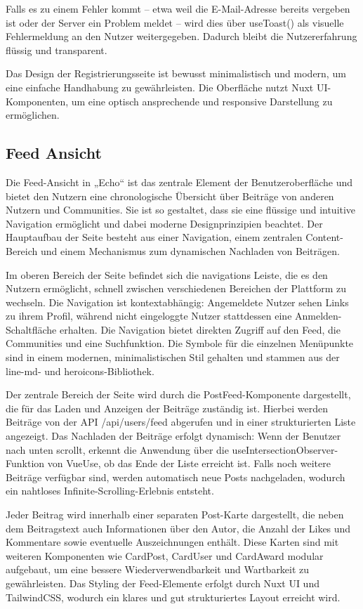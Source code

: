 \documentclass[a4paper,12pt]{article}
\begin{document}
Falls es zu einem Fehler kommt – etwa weil die E-Mail-Adresse bereits vergeben
ist oder der Server ein Problem meldet – wird dies über useToast() als visuelle
Fehlermeldung an den Nutzer weitergegeben. Dadurch bleibt die Nutzererfahrung
flüssig und transparent.

Das Design der Registrierungsseite ist bewusst minimalistisch und modern, um
eine einfache Handhabung zu gewährleisten. Die Oberfläche nutzt Nuxt
UI-Komponenten, um eine optisch ansprechende und responsive Darstellung zu
ermöglichen.

\subsection{Feed Ansicht}
Die Feed-Ansicht in „Echo“ ist das zentrale Element der Benutzeroberfläche und
bietet den Nutzern eine chronologische Übersicht über Beiträge von anderen
Nutzern und Communities. Sie ist so gestaltet, dass sie eine flüssige und
intuitive Navigation ermöglicht und dabei moderne Designprinzipien beachtet.
Der Hauptaufbau der Seite besteht aus einer Navigation, einem zentralen
Content-Bereich und einem Mechanismus zum dynamischen Nachladen von Beiträgen.

\newpage
Im oberen Bereich der Seite befindet sich die navigations Leiste, die es den
Nutzern ermöglicht, schnell zwischen verschiedenen Bereichen der Plattform zu
wechseln. Die Navigation ist kontextabhängig: Angemeldete Nutzer sehen Links zu
ihrem Profil, während nicht eingeloggte Nutzer stattdessen eine
Anmelden-Schaltfläche erhalten. Die Navigation bietet direkten Zugriff auf den
Feed, die Communities und eine Suchfunktion. Die Symbole für die einzelnen
Menüpunkte sind in einem modernen, minimalistischen Stil gehalten und stammen
aus der line-md- und heroicons-Bibliothek.

Der zentrale Bereich der Seite wird durch die PostFeed-Komponente dargestellt,
die für das Laden und Anzeigen der Beiträge zuständig ist. Hierbei werden
Beiträge von der API /api/users/feed abgerufen und in einer strukturierten
Liste angezeigt. Das Nachladen der Beiträge erfolgt dynamisch: Wenn der
Benutzer nach unten scrollt, erkennt die Anwendung über die
useIntersectionObserver-Funktion von VueUse, ob das Ende der Liste erreicht
ist. Falls noch weitere Beiträge verfügbar sind, werden automatisch neue Posts
nachgeladen, wodurch ein nahtloses Infinite-Scrolling-Erlebnis entsteht.

Jeder Beitrag wird innerhalb einer separaten Post-Karte dargestellt, die neben
dem Beitragstext auch Informationen über den Autor, die Anzahl der Likes und
Kommentare sowie eventuelle Auszeichnungen enthält. Diese Karten sind mit
weiteren Komponenten wie CardPost, CardUser und CardAward modular aufgebaut, um
eine bessere Wiederverwendbarkeit und Wartbarkeit zu gewährleisten. Das Styling
der Feed-Elemente erfolgt durch Nuxt UI und TailwindCSS, wodurch ein klares und
gut strukturiertes Layout erreicht wird.
\end{document}

